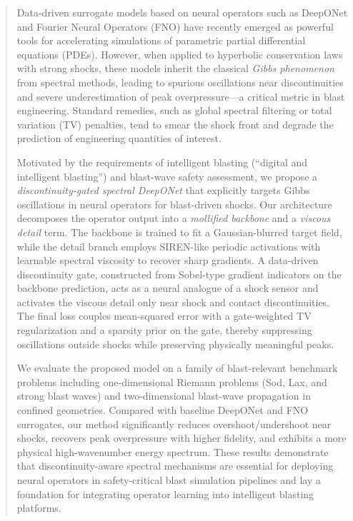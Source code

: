 \documentclass[a4paper,fleqn]{cas-dc}
\begin{document}
\begin{abstract}
Data-driven surrogate models based on neural operators such as DeepONet and Fourier Neural Operators (FNO) have recently emerged as powerful tools for accelerating simulations of parametric partial differential equations (PDEs).
However, when applied to hyperbolic conservation laws with strong shocks, these models inherit the classical \emph{Gibbs phenomenon} from spectral methods, leading to spurious oscillations near discontinuities and severe underestimation of peak overpressure---a critical metric in blast engineering.
Standard remedies, such as global spectral filtering or total variation (TV) penalties, tend to smear the shock front and degrade the prediction of engineering quantities of interest.

Motivated by the requirements of intelligent blasting (``digital and intelligent blasting'') and blast-wave safety assessment, we propose a \emph{discontinuity-gated spectral DeepONet} that explicitly targets Gibbs oscillations in neural operators for blast-driven shocks.
Our architecture decomposes the operator output into a \emph{mollified backbone} and a \emph{viscous detail} term.
The backbone is trained to fit a Gaussian-blurred target field, while the detail branch employs SIREN-like periodic activations with learnable spectral viscosity to recover sharp gradients.
A data-driven discontinuity gate, constructed from Sobel-type gradient indicators on the backbone prediction, acts as a neural analogue of a shock sensor and activates the viscous detail only near shock and contact discontinuities.
The final loss couples mean-squared error with a gate-weighted TV regularization and a sparsity prior on the gate, thereby suppressing oscillations outside shocks while preserving physically meaningful peaks.

We evaluate the proposed model on a family of blast-relevant benchmark problems including one-dimensional Riemann problems (Sod, Lax, and strong blast waves) and two-dimensional blast-wave propagation in confined geometries.
Compared with baseline DeepONet and FNO surrogates, our method significantly reduces overshoot/undershoot near shocks, recovers peak overpressure with higher fidelity, and exhibits a more physical high-wavenumber energy spectrum.
These results demonstrate that discontinuity-aware spectral mechanisms are essential for deploying neural operators in safety-critical blast simulation pipelines and lay a foundation for integrating operator learning into intelligent blasting platforms.
\end{abstract}
\end{document}
